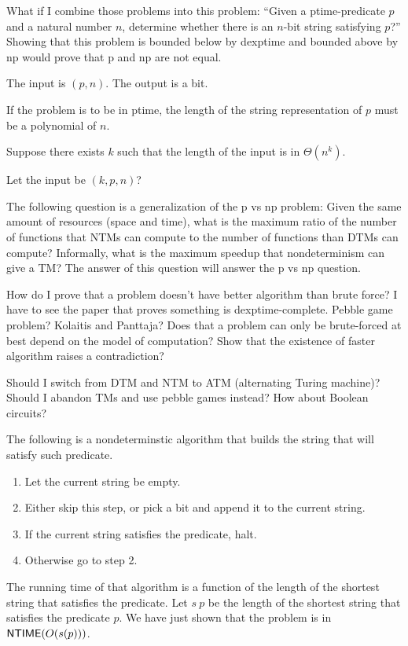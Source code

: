 What if I combine those problems into this problem:
``Given a ptime-predicate $p$ and a natural number $n$,
determine whether there is an $n$-bit string satisfying $p$?''
Showing that this problem is bounded below by dexptime
and bounded above by np would prove that p and np are not equal.

The input is $(p,n)$.
The output is a bit.

If the problem is to be in ptime,
the length of the string representation of $p$
must be a polynomial of $n$.

Suppose there exists $k$ such that the length of the input is in $\Theta(n^k)$.

Let the input be $(k,p,n)$?

The following question is a generalization of the p vs np problem:
Given the same amount of resources (space and time),
what is the maximum ratio of the number of functions that NTMs can compute
to the number of functions than DTMs can compute?
Informally, what is the maximum speedup
that nondeterminism can give a TM?
The answer of this question will answer the p vs np question.

How do I prove that a problem doesn't have better algorithm than brute force?
I have to see the paper that proves something is dexptime-complete.
Pebble game problem? Kolaitis and Panttaja?
Does that a problem can only be brute-forced at best
depend on the model of computation?
Show that the existence of faster algorithm raises a contradiction?

Should I switch from DTM and NTM to ATM (alternating Turing machine)?
Should I abandon TMs and use pebble games instead?
How about Boolean circuits?

The following is a nondeterminstic algorithm that
builds the string that will satisfy such predicate.
\begin{enumerate}
\item Let the current string be empty.
\item Either skip this step,
or pick a bit and append it to the current string.
\item If the current string satisfies the predicate, halt.
\item Otherwise go to step 2.
\end{enumerate}
The running time of that algorithm is a function of the length
of the shortest string that satisfies the predicate.
Let $s~p$ be the length of the shortest string that satisfies the predicate $p$.
We have just shown that the problem is in $\operatorname{\mathsf{NTIME}}(O(s(p)))$.

